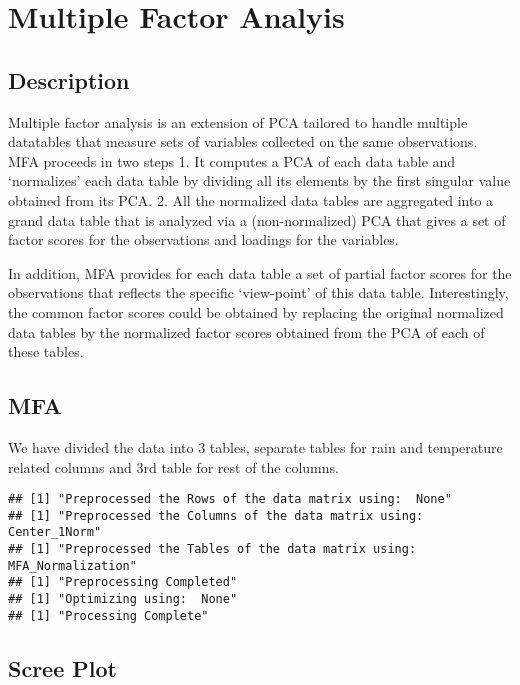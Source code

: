 \documentclass[]{book}
\begin{document}
\hypertarget{multiple-factor-analyis}{%
\chapter{Multiple Factor Analyis}\label{multiple-factor-analyis}}

\hypertarget{description-5}{%
\section{Description}\label{description-5}}

Multiple factor analysis is an extension of PCA tailored to handle
multiple datatables that measure sets of variables collected on the same
observations. MFA proceeds in two steps 1. It computes a PCA of each
data table and `normalizes' each data table by dividing all its elements
by the ﬁrst singular value obtained from its PCA. 2. All the normalized
data tables are aggregated into a grand data table that is analyzed via
a (non-normalized) PCA that gives a set of factor scores for the
observations and loadings for the variables.

In addition, MFA provides for each data table a set of partial factor
scores for the observations that reﬂects the speciﬁc `view-point' of
this data table. Interestingly, the common factor scores could be
obtained by replacing the original normalized data tables by the
normalized factor scores obtained from the PCA of each of these tables.

\hypertarget{mfa}{%
\section{MFA}\label{mfa}}

We have divided the data into 3 tables, separate tables for rain and
temperature related columns and 3rd table for rest of the columns.

\begin{verbatim}
## [1] "Preprocessed the Rows of the data matrix using:  None"
## [1] "Preprocessed the Columns of the data matrix using:  Center_1Norm"
## [1] "Preprocessed the Tables of the data matrix using:  MFA_Normalization"
## [1] "Preprocessing Completed"
## [1] "Optimizing using:  None"
## [1] "Processing Complete"
\end{verbatim}

\hypertarget{scree-plot-5}{%
\section{Scree Plot}\label{scree-plot-5}}
\end{document}
